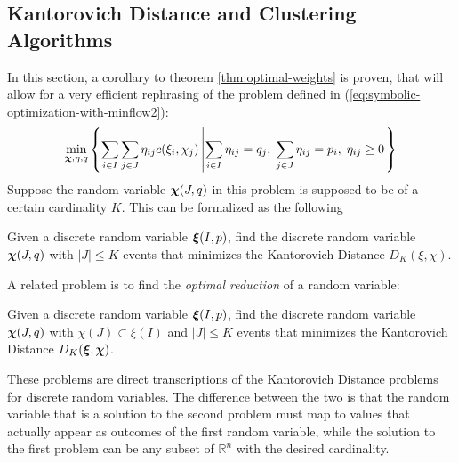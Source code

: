 \subsection{Kantorovich Distance and Clustering Algorithms}
\label{sec:kantorovich-and-clusters}
In this section, a corollary to theorem \ref{thm:optimal-weights} is proven, that will allow for a very efficient rephrasing of the problem defined in (\ref{eq:symbolic-optimization-with-minflow2}):
\[
  \min_{\boldsymbol\chi,\eta,q}\left\{\sum_{i\in I}\sum_{j\in J}\eta_{ij}c(\xi_i,\chi_j)\left|\sum_{i\in I}\eta_{ij}=q_j,\;\sum_{j\in J}\eta_{ij}=p_i,\;\eta_{ij}\geq 0\right.\right\}
\]
Suppose the random variable $\boldsymbol\chi(J,q)$ in this problem is supposed to be of a certain cardinality $K$.
This can be formalized as the following
\begin{problem}
\label{prb:CE-Kantorovich-randvar}
  Given a discrete random variable $\boldsymbol\xi(I,p)$, find the discrete random variable $\boldsymbol\chi(J,q)$ with $|J | \leq K$ events that minimizes the Kantorovich Distance $D_K(\xi,\chi)$.
\end{problem}
A related problem is to find the \textit{optimal reduction} of a random variable:
\begin{problem}
  \label{prb:DE-Kantorovich-randvar}
  Given a discrete random variable $\boldsymbol\xi(I,p)$, find the discrete random variable $\boldsymbol\chi(J,q)$ with $\chi(J)\subset\xi(I)$ and $|J | \leq K$ events that minimizes the Kantorovich Distance $D_K(\boldsymbol\xi,\boldsymbol\chi)$.
\end{problem}
These problems are direct transcriptions of the Kantorovich Distance problems for discrete random variables.
The difference between the two is that the random variable that is a solution to the second problem must map to values that actually appear as outcomes of the first random variable,
while the solution to the first problem can be any subset of $\mathbb{R}^n$ with the desired cardinality.

